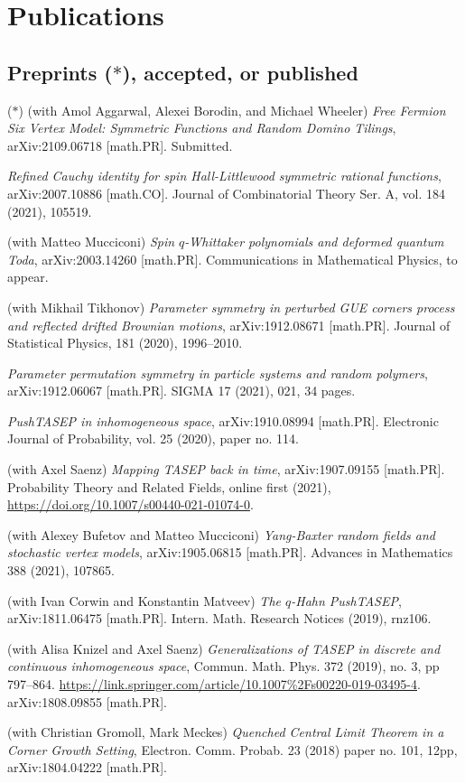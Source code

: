 \documentclass[letterpaper,11pt]{article}
\begin{document}
\section*{Publications}

\subsection*{Preprints ($*$), accepted, or published}

\begin{etaremune}
	\renewcommand{\labelenumi}{[\theenumi]}
	\item ($*$)
		(with Amol Aggarwal, Alexei Borodin, and Michael Wheeler)
		\emph{Free Fermion Six Vertex Model: Symmetric Functions and Random Domino Tilings},
		arXiv:2109.06718 [math.PR]. Submitted.
	\item 
		\emph{Refined Cauchy identity for spin Hall-Littlewood symmetric rational functions},
		arXiv:2007.10886 [math.CO].
		Journal of Combinatorial Theory Ser. A, vol. 184 (2021), 105519.
	\item
		(with Matteo Mucciconi)
		\emph{Spin $q$-Whittaker polynomials and deformed quantum Toda},
		arXiv:2003.14260 [math.PR]. Communications in Mathematical Physics, to appear.
	\item
		(with Mikhail Tikhonov)
		\emph{Parameter symmetry in perturbed GUE corners process and reflected drifted Brownian motions},
		arXiv:1912.08671 [math.PR]. Journal of Statistical Physics, 181 (2020), 1996–2010.
	\item 
		\emph{Parameter permutation symmetry in particle systems and random polymers},
		arXiv:1912.06067 [math.PR]. SIGMA 17 (2021), 021, 34 pages.
	\item 
		\emph{PushTASEP in inhomogeneous space},
		arXiv:1910.08994 [math.PR]. Electronic Journal of Probability, vol. 25 (2020), paper no. 114.
	\item 
		(with Axel Saenz)
		\emph{Mapping TASEP back in time},
		arXiv:1907.09155 [math.PR]. 
		Probability Theory and Related Fields, online first (2021), \url{https://doi.org/10.1007/s00440-021-01074-0}.
\item 
	(with Alexey Bufetov and Matteo Mucciconi)
	\emph{Yang-Baxter random fields and stochastic vertex models},
	arXiv:1905.06815 [math.PR]. Advances in Mathematics 388 (2021), 107865.
\item 
	(with Ivan Corwin and Konstantin Matveev)
	\emph{The $q$-Hahn PushTASEP},
	arXiv:1811.06475 [math.PR]. Intern. Math. Research Notices (2019), rnz106.
\item 
	(with Alisa Knizel and
		Axel Saenz)
		\emph{Generalizations of TASEP in discrete and continuous inhomogeneous space},
		Commun. Math. Phys. 
		372 (2019), no. 3, pp 797–864.
		\url{https://link.springer.com/article/10.1007%2Fs00220-019-03495-4}.
		arXiv:1808.09855 [math.PR].
\item (with Christian Gromoll, Mark Meckes)
		\emph{Quenched Central Limit Theorem in a Corner Growth Setting},
		Electron. Comm. Probab. 23 (2018) paper no. 101, 12pp,
		arXiv:1804.04222 [math.PR].
	

\end{etaremune}
\end{document}

